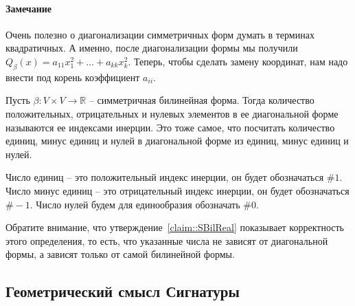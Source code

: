 \paragraph{Замечание}

Очень полезно о диагонализации симметричных форм думать в терминах квадратичных.
А именно, после диагонализации формы мы получили $Q_\beta(x) = a_{11}x_1^2 + \ldots +a_{kk}x_k^2$.
Теперь, чтобы сделать замену координат, нам надо внести под корень коэффициент $a_{ii}$.

\begin{definition}
Пусть $\beta\colon V\times V\to \mathbb R$ -- симметричная билинейная форма.
Тогда количество положительных, отрицательных и нулевых элементов в ее диагональной форме называются ее индексами инерции.
Это тоже самое, что посчитать количество единиц, минус единиц и нулей в диагональной форме из единиц, минус единиц и нулей.

Число единиц -- это положительный индекс инерции, он будет обозначаться $\#1$.
Число минус единиц -- это отрицательный индекс инерции, он будет обозначаться $\#-1$.
Число нулей будем для единообразия обозначать $\#0$.
\end{definition}

Обратите внимание, что утверждение~\ref{claim::SBilReal} показывает корректность этого определения, то есть, что указанные числа не зависят от диагональной формы, а зависят только от самой билинейной формы.


\subsection{Геометрический смысл Сигнатуры}

